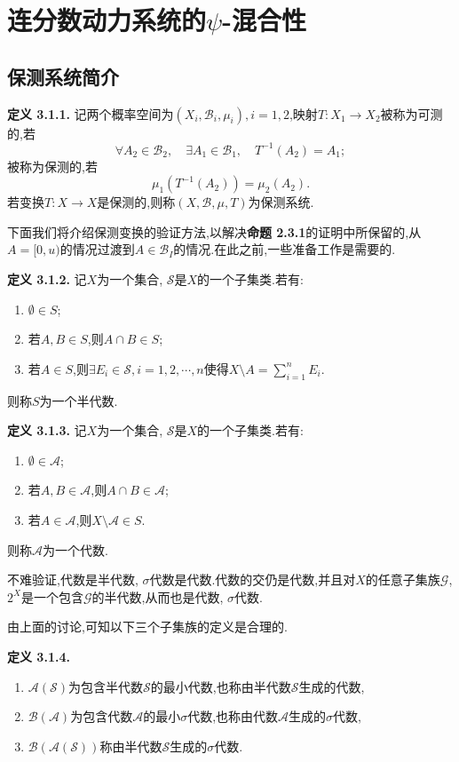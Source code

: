 \section{连分数动力系统的$\psi$-混合性}

\subsection{保测系统简介}
\textbf{定义 3.1.1.  }
记两个概率空间为$(X_i,\mathcal{B}_i,\mu_i),i=1,2$,映射$T:X_1\to X_2$被称为可测的,若
$$\forall A_2\in\mathcal{B}_2,\quad \exists A_1\in\mathcal{B}_1,\quad T^{-1}(A_2)=A_1;$$
被称为保测的,若
$$\mu_1(T^{-1}(A_2))=\mu_2(A_2).$$
若变换$T:X\to X$是保测的,则称$(X,\mathcal{B},\mu,T)$为保测系统.
\par
下面我们将介绍保测变换的验证方法,以解决\textbf{命题 2.3.1}的证明中所保留的,从$A=[0,u)$的情况过渡到$A\in\mathcal{B}_I$的情况.在此之前,一些准备工作是需要的.\par
\textbf{定义 3.1.2.  }
记$X$为一个集合, $\mathcal{S}$是$X$的一个子集类.若有:
\begin{enumerate}
    \item $\emptyset\in S$;
    \item 若$A,B\in S$,则$A\cap B\in S$;
    \item 若$A\in S$,则$\exists E_i\in \mathcal{S},i=1,2,\cdots,n$使得$X\setminus A=\sum\limits_{i=1}^n E_i$.
\end{enumerate}
则称$S$为一个半代数.\par
\par
\textbf{定义 3.1.3.  }
记$X$为一个集合, $\mathcal{S}$是$X$的一个子集类.若有:
\begin{enumerate}
    \item $\emptyset\in \mathcal{A}$;
    \item 若$A,B\in \mathcal{A}$,则$A\cap B\in \mathcal{A}$;
    \item 若$A\in \mathcal{A}$,则$X\setminus \mathcal{A}\in S$.
\end{enumerate}
则称$\mathcal{A}$为一个代数.\par
\par
不难验证,代数是半代数, $\sigma$代数是代数.代数的交仍是代数,并且对$X$的任意子集族$\mathcal{G}$, $2^X$是一个包含$\mathcal{G}$的半代数,从而也是代数, $\sigma$代数.\par
由上面的讨论,可知以下三个子集族的定义是合理的.\par
\textbf{定义 3.1.4.  }
\begin{enumerate}
    \item $\mathcal{A}(\mathcal{S})$为包含半代数$\mathcal{S}$的最小代数,也称由半代数$\mathcal{S}$生成的代数,
    \item $\mathcal{B}(\mathcal{A})$为包含代数$\mathcal{A}$的最小$\sigma$代数,也称由代数$\mathcal{A}$生成的$\sigma$代数,
    \item $\mathcal{B}(\mathcal{A}(\mathcal{S}))$称由半代数$\mathcal{S}$生成的$\sigma$代数.
\end{enumerate}
